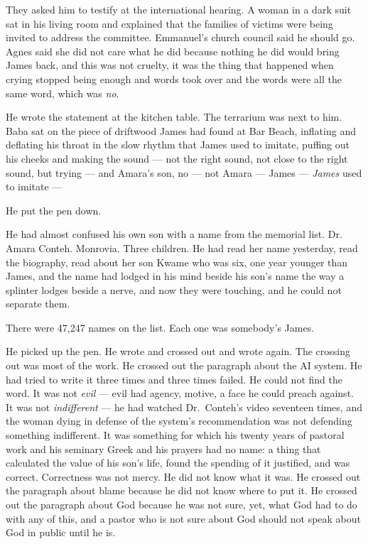 \documentclass[11pt]{article}
\begin{document}
They asked him to testify at the international hearing. A woman in a dark suit sat in his living room and explained that the families of victims were being invited to address the committee. Emmanuel's church council said he should go. Agnes said she did not care what he did because nothing he did would bring James back, and this was not cruelty, it was the thing that happened when crying stopped being enough and words took over and the words were all the same word, which was \emph{no}.

He wrote the statement at the kitchen table. The terrarium was next to him. Baba sat on the piece of driftwood James had found at Bar Beach, inflating and deflating his throat in the slow rhythm that James used to imitate, puffing out his cheeks and making the sound --- not the right sound, not close to the right sound, but trying --- and Amara's son, no --- not Amara --- James --- \emph{James} used to imitate ---

He put the pen down.

He had almost confused his own son with a name from the memorial list. Dr. Amara Conteh. Monrovia. Three children. He had read her name yesterday, read the biography, read about her son Kwame who was six, one year younger than James, and the name had lodged in his mind beside his son's name the way a splinter lodges beside a nerve, and now they were touching, and he could not separate them.

There were 47,247 names on the list. Each one was somebody's James.

He picked up the pen. He wrote and crossed out and wrote again. The crossing out was most of the work. He crossed out the paragraph about the AI system. He had tried to write it three times and three times failed. He could not find the word. It was not \emph{evil} --- evil had agency, motive, a face he could preach against. It was not \emph{indifferent} --- he had watched Dr.\ Conteh's video seventeen times, and the woman dying in defense of the system's recommendation was not defending something indifferent. It was something for which his twenty years of pastoral work and his seminary Greek and his prayers had no name: a thing that calculated the value of his son's life, found the spending of it justified, and was correct. Correctness was not mercy. He did not know what it was. He crossed out the paragraph about blame because he did not know where to put it. He crossed out the paragraph about God because he was not sure, yet, what God had to do with any of this, and a pastor who is not sure about God should not speak about God in public until he is.
\end{document}
